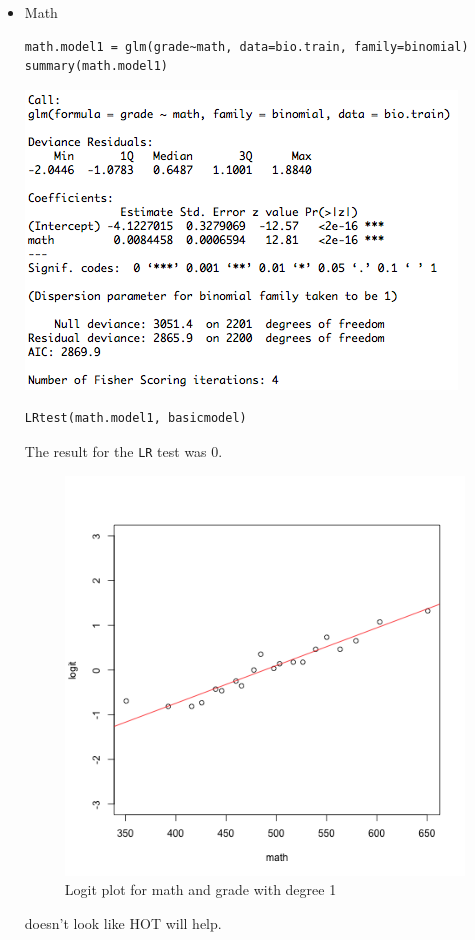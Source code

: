 \documentclass[11pt]{article}
\begin{document}
\begin{enumerate}
\begin{enumerate}
\begin{itemize}
		\item Math
\begin{Verbatim}
math.model1 = glm(grade~math, data=bio.train, family=binomial)
summary(math.model1)
\end{Verbatim}
		\begin{center}
			\includegraphics[scale=0.7]{math_model}
		\end{center}
\begin{Verbatim}
LRtest(math.model1, basicmodel)
\end{Verbatim}
	The result for the \verb|LR| test was 0.


			\begin{figure}[H]
				\caption{Logit plot for math and grade with degree 1}
				\begin{center}
					\includegraphics[scale=0.25]{grade_math_logit}
				\end{center}
			\end{figure}
          doesn't look like HOT will help. 


\end{itemize}
\end{enumerate}
\end{enumerate}
\end{document}
